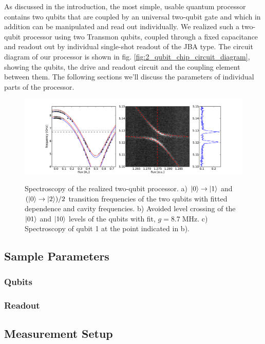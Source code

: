 As discussed in the introduction, the most simple, usable quantum processor contains two qubits that are coupled by an universal two-qubit gate and which in addition can be manipulated and read out individually. We realized such a two-qubit processor using two Transmon qubits, coupled through a fixed capacitance and readout out by individual single-shot readout of the JBA type. The circuit diagram of our processor is shown in fig. \ref{fig:2_qubit_chip_circuit_diagram}, showing the qubits, the drive and readout circuit and the coupling element between them. The following sections we'll discuss the parameters of individual parts of the processor.

\begin{figure}
	\centering
		\includegraphics[width=1.\textwidth]{"./data/ct5/2011_04_11 - anticrossing/processor_spectroscopy"}
	\label{fig:ProcessorSpectroscopy}
	\caption[Spectroscopy of the Two-Qubit Processor]{Spectroscopy of the realized two-qubit processor. a) $\left| 0 \right>\to\left| 1 \right>$ and $(\left| 0 \right>\to\left| 2 \right>)/2$ transition frequencies of the two qubits with fitted dependence and cavity frequencies. b) Avoided level crossing of the $\left| 01 \right>$ and $\left| 10 \right>$ levels of the qubits with fit, $g = 8.7 \; \mathrm{MHz}$. c) Spectroscopy of qubit 1 at the point indicated in b).}
\end{figure}

\subsection{Sample Parameters}

\subsubsection{Qubits}

\subsubsection{Readout}

\subsection{Measurement Setup}

